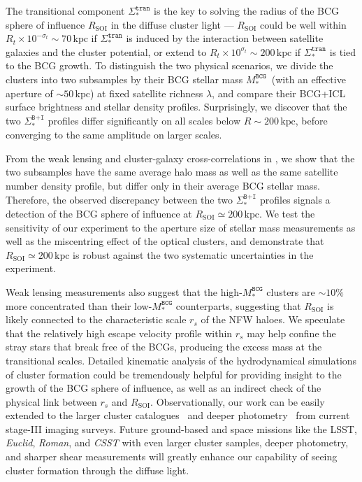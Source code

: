 \documentclass[fleqn,usenatbib]{mnras}
\newcommand{\rsoi}{R_{\mathrm{SOI}}}
\newcommand{\sigbi}{\Sigma_*^{\texttt{B+I}}}
\newcommand{\sigtr}{\Sigma_*^{\texttt{tran}}}
\newcommand{\msbcg}{M_*^{\texttt{BCG}}}
\newcommand{\kpc}{\mathrm{kpc}}
\providecommand{\DIFaddtex}[1]{{\protect\color{blue}\uwave{#1}}} %
\providecommand{\DIFaddbegin}{} %
\providecommand{\DIFaddend}{} %
\providecommand{\DIFadd}[1]{\texorpdfstring{\DIFaddtex{#1}}{#1}} %
\newcommand{\DIFaddincludegraphics}[2][]{{\color{blue}\fbox{\DIFOincludegraphics[#1]{#2}}}} %
\DeclareRobustCommand{\DIFaddbegin}{\DIFOaddbegin \let\includegraphics\DIFaddincludegraphics} %
\DeclareRobustCommand{\DIFaddend}{\DIFOaddend \let\includegraphics\DIFOincludegraphics} %
\begin{document}
The transitional component $\sigtr$ is the key to solving the radius of the
BCG sphere of influence $\rsoi$ in the diffuse cluster light --- $\rsoi$
could be well within $R_t{\times}10^{-\sigma_t}{\sim}70\,\kpc$ if $\sigtr$
is induced by the interaction between satellite galaxies and the cluster
potential, or extend to $R_t{\times}10^{\sigma_t}{\sim}200\,\kpc$ if
$\sigtr$ is tied to the BCG growth. To distinguish the two physical
scenarios, we divide the clusters into two subsamples by their BCG stellar
mass $\msbcg$~(with an effective aperture of ${\sim}50\,\kpc$) at fixed
satellite richness $\lambda$, and compare their BCG+ICL surface brightness
and stellar density profiles.  Surprisingly, we discover that the two
$\sigbi$ profiles differ significantly on all scales below
$R{\sim}200\,\kpc$, before converging to the same amplitude on larger
scales.


From the weak lensing and cluster-galaxy cross-correlations in
, we show that the two subsamples have the same average
halo mass as well as the same satellite number
density profile, but differ only in their average BCG stellar mass.
Therefore, the observed discrepancy between the two $\sigbi$ profiles
signals a detection of the BCG sphere of influence at
$\rsoi{\simeq}200\,\kpc$.  We test the sensitivity of our experiment to the
aperture size of stellar mass measurements as well as the miscentring
effect of the optical clusters, and demonstrate that $\rsoi{\simeq}200\,\kpc$ is
robust against the two systematic uncertainties in the experiment.


Weak lensing measurements also suggest that the high-$\msbcg$ clusters are
${\sim}10\%$ more concentrated than their low-$\msbcg$ counterparts,
suggesting that $\rsoi$ is likely connected to the characteristic scale
$r_s$ of the NFW haloes. We speculate that the relatively high escape
velocity profile within $r_s$ may help confine the stray stars that break
free of the BCGs, producing the excess mass at the transitional
scales\DIFaddbegin \DIFadd{~\mbox{%
\citep{Kelson2002, Bender2015, Veale2018}}\hspace{0pt}%
}\DIFaddend . Detailed kinematic analysis of the hydrodynamical simulations of cluster
formation could be tremendously helpful for providing insight to the growth
of the BCG sphere of influence, as well as an indirect check of the
physical link between $r_s$ and $\rsoi$. Observationally, our work can be
easily extended to the larger cluster catalogues~\citep{Zou2021, Wen2021,
Yang2021} and deeper photometry~\citep{Huang2021, Li2021} from current
stage-III imaging surveys.  Future ground-based and space missions like the
LSST, {\it Euclid}, {\it Roman}, and {\it CSST} with even larger cluster
samples, deeper photometry, and sharper shear measurements will greatly
enhance our capability of seeing cluster formation through the diffuse
light.
\end{document}
